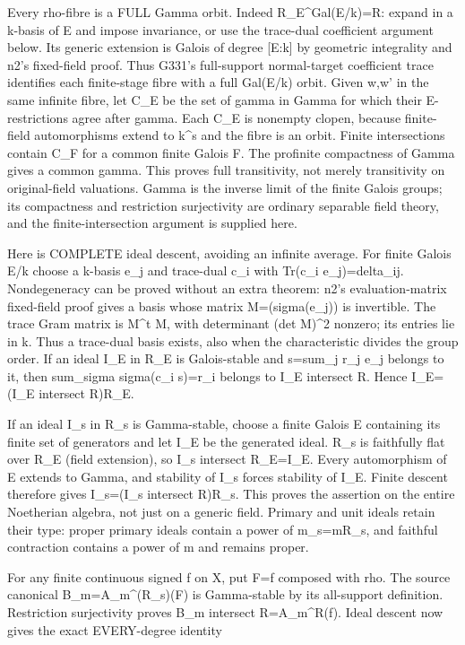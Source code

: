 \documentclass[11pt]{article}
\begin{document}
Every rho-fibre is a FULL Gamma orbit. Indeed R\_E\textasciicircum{}Gal(E/k)=R: expand in a k-basis of E and impose invariance, or use the trace-dual coefficient argument below. Its generic extension is Galois of degree [E:k] by geometric integrality and n2's fixed-field proof. Thus G331's full-support normal-target coefficient trace identifies each finite-stage fibre with a full Gal(E/k) orbit. Given w,w' in the same infinite fibre, let C\_E be the set of gamma in Gamma for which their E-restrictions agree after gamma. Each C\_E is nonempty clopen, because finite-field automorphisms extend to k\textasciicircum{}s and the fibre is an orbit. Finite intersections contain C\_F for a common finite Galois F. The profinite compactness of Gamma gives a common gamma. This proves full transitivity, not merely transitivity on original-field valuations. Gamma is the inverse limit of the finite Galois groups; its compactness and restriction surjectivity are ordinary separable field theory, and the finite-intersection argument is supplied here.

Here is COMPLETE ideal descent, avoiding an infinite average. For finite Galois E/k choose a k-basis e\_j and trace-dual c\_i with Tr(c\_i e\_j)=delta\_ij. Nondegeneracy can be proved without an extra theorem: n2's evaluation-matrix fixed-field proof gives a basis whose matrix M=(sigma(e\_j)) is invertible. The trace Gram matrix is M\textasciicircum{}t M, with determinant (det M)\textasciicircum{}2 nonzero; its entries lie in k. Thus a trace-dual basis exists, also when the characteristic divides the group order. If an ideal I\_E in R\_E is Galois-stable and s=sum\_j r\_j e\_j belongs to it, then sum\_sigma sigma(c\_i s)=r\_i belongs to I\_E intersect R. Hence I\_E=(I\_E intersect R)R\_E.

If an ideal I\_s in R\_s is Gamma-stable, choose a finite Galois E containing its finite set of generators and let I\_E be the generated ideal. R\_s is faithfully flat over R\_E (field extension), so I\_s intersect R\_E=I\_E. Every automorphism of E extends to Gamma, and stability of I\_s forces stability of I\_E. Finite descent therefore gives I\_s=(I\_s intersect R)R\_s. This proves the assertion on the entire Noetherian algebra, not just on a generic field. Primary and unit ideals retain their type: proper primary ideals contain a power of m\_s=mR\_s, and faithful contraction contains a power of m and remains proper.

For any finite continuous signed f on X, put F=f composed with rho. The source canonical B\_m=A\_m\textasciicircum{}(R\_s)(F) is Gamma-stable by its all-support definition. Restriction surjectivity proves B\_m intersect R=A\_m\textasciicircum{}R(f). Ideal descent now gives the exact EVERY-degree identity
\end{document}
